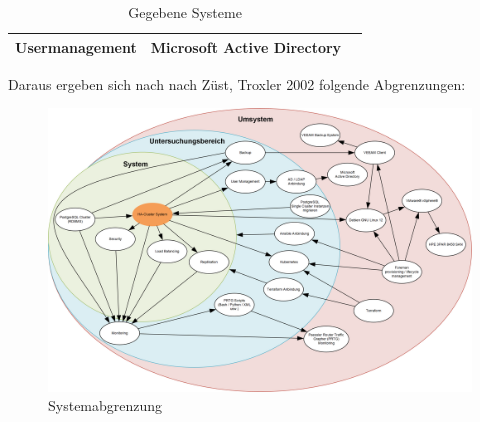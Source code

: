 \begin{landscape}
\begin{table}[H]
{\begin{tabular}{lll}
    Usermanagement                            & Microsoft Active Directory                                                                  &                                                                                                                                                       \\ \hline
    \end{tabular}%
    }
    \caption{Gegebene Systeme}
    \label{tab:gegebene_systeme}
    \end{table}

    \begin{flushleft}
    Daraus ergeben sich nach nach Z\"ust, Troxler 2002\cite{EDGTQIKU} folgende Abgrenzungen:
    \end{flushleft}
    \begin{figure}[H]
        \centering
        \includegraphics[width=1\linewidth]{source/introduction/delimitations/systemabgrenzungen}
        \caption{Systemabgrenzung}
        \label{fig:systemabgrenzungen}
    \end{figure}
\end{landscape}


